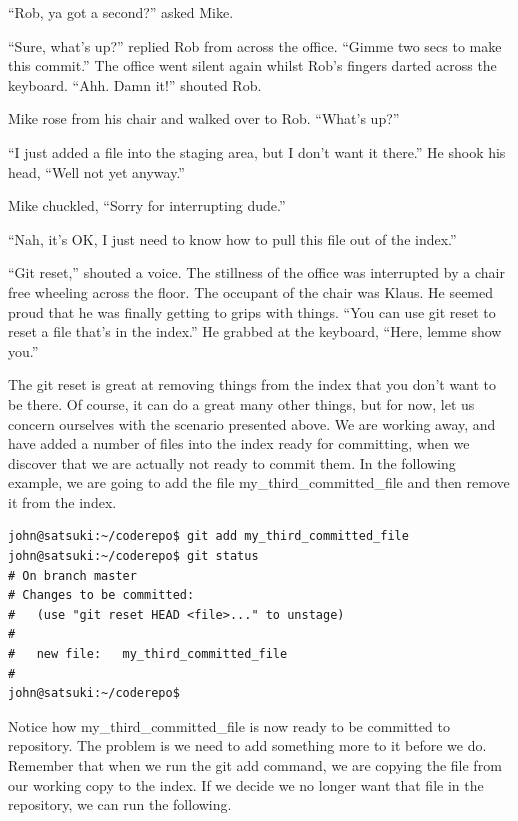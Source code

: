 \begin{trenches}
``Rob, ya got a second?'' asked Mike.

``Sure, what's up?'' replied Rob from across the office.
``Gimme two secs to make this commit.'' The office went silent again whilst Rob's fingers darted across the keyboard.
``Ahh. Damn it!'' shouted Rob.

Mike rose from his chair and walked over to Rob.
``What's up?''

``I just added a file into the staging area, but I don't want it there.''
He shook his head, ``Well not yet anyway.''

Mike chuckled, ``Sorry for interrupting dude.''

``Nah, it's OK, I just need to know how to pull this file out of the index.''

``Git reset,'' shouted a voice.
The stillness of the office was interrupted by a chair free wheeling across the floor.
The occupant of the chair was Klaus.
He seemed proud that he was finally getting to grips with things.
``You can use git reset to reset a file that's in the index.''
He grabbed at the keyboard, ``Here, lemme show you.''
\end{trenches}

The git reset is great at removing things from the index that you don't want to be there.
Of course, it can do a great many other things, but for now, let us concern ourselves with the scenario presented above.
We are working away, and have added a number of files into the index ready for committing, when we discover that we are actually not ready to commit them.
In the following example, we are going to add the file my\_third\_committed\_file and then remove it from the index.

\begin{Verbatim}
john@satsuki:~/coderepo$ git add my_third_committed_file
john@satsuki:~/coderepo$ git status
# On branch master
# Changes to be committed:
#   (use "git reset HEAD <file>..." to unstage)
#
#	new file:   my_third_committed_file
#
john@satsuki:~/coderepo$
\end{Verbatim}

Notice how my\_third\_committed\_file is now ready to be committed to repository.
The problem is we need to add something more to it before we do.
Remember that when we run the git add command, we are copying the file from our working copy to the index.
If we decide we no longer want that file in the repository, we can run the following.

